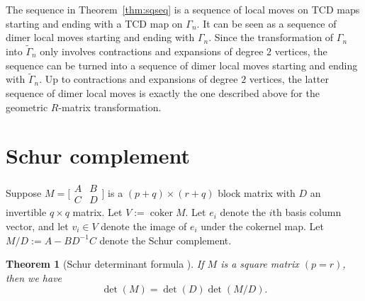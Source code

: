 \documentclass[pdftex]{sigma}
\numberwithin{equation}{section}
\newtheorem{Theorem}{Theorem}[section]
\newcommand{\C}{{\mathbb C}}
\newcommand{\la}{\label}
\DeclareMathOperator{\coker}{coker}
\begin{document}
	The sequence in Theorem~\ref{thm:sqseq} is a sequence of local moves on TCD maps starting and ending with a TCD map on $\Gamma_n$. It can be seen as a sequence of dimer local moves starting and ending with $\Gamma_n$. Since the transformation of $\Gamma_n$ into $\widetilde\Gamma_n$ only involves contractions and expansions of degree $2$ vertices, the sequence can be turned into a sequence of dimer local moves starting and ending with $\widetilde\Gamma_n$. Up to contractions and expansions of degree $2$ vertices, the latter sequence of dimer local moves is exactly the one described above for the geometric $R$-matrix transformation.
	
\appendix

		\section{Schur complement}
		\label{sec:schur}
		Suppose $M=\bigl[\begin{smallmatrix}
			A &B\\C&D
		\end{smallmatrix}\bigr]$
		is a $(p+q) \times (r+q)$ block matrix with $D$ an invertible $q \times q$ matrix. Let $V:=\coker M$. Let $e_i$ denote the $i$th basis column vector, and let $v_i \in V$ denote the image of $e_i$ under the cokernel map. Let $M/D:=A-B D^{-1} C$ denote the Schur complement.
		
		\begin{Theorem}[Schur determinant formula \cite{Schur}] \la{thm::schur1}
			If $M$ is a square matrix $(p=r)$, then we have%
			\[
			\det (M) = \det (D) \det (M/D).
			\]
		\end{Theorem}
		
\end{document}
